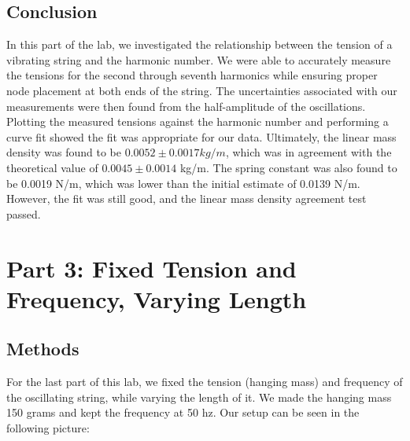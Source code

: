 \documentclass[11pt]{article}
\let\oldsection\section
\renewcommand\section{\clearpage\oldsection}
\begin{document}
    \subsection{Conclusion}\label{subsec:part_2_conclusion}

    In this part of the lab, we investigated the relationship between the tension of a vibrating string and the harmonic number.
    We were able to accurately measure the tensions for the second through seventh harmonics while ensuring proper node placement at both ends of the string.
    The uncertainties associated with our measurements were then found from the half-amplitude of the oscillations.
    Plotting the measured tensions against the harmonic number and performing a curve fit showed the fit was appropriate for our data.
    Ultimately, the linear mass density was found to be $0.0052 \pm 0.0017 kg/m$, which was in agreement with the theoretical value of $0.0045 \pm 0.0014$ kg/m.
    The spring constant was also found to be 0.0019 N/m, which was lower than the initial estimate of 0.0139 N/m.
    However, the fit was still good, and the linear mass density agreement test passed.


    \section{Part 3: Fixed Tension and Frequency, Varying Length}\label{sec:part_3}

    \subsection{Methods}\label{subsec:part_3_methods}
    For the last part of this lab, we fixed the tension (hanging mass) and frequency of the oscillating string, while varying the length of it. We made the hanging mass 150 grams and kept the frequency at 50 hz. Our setup can be seen in the following picture:
\end{document}
